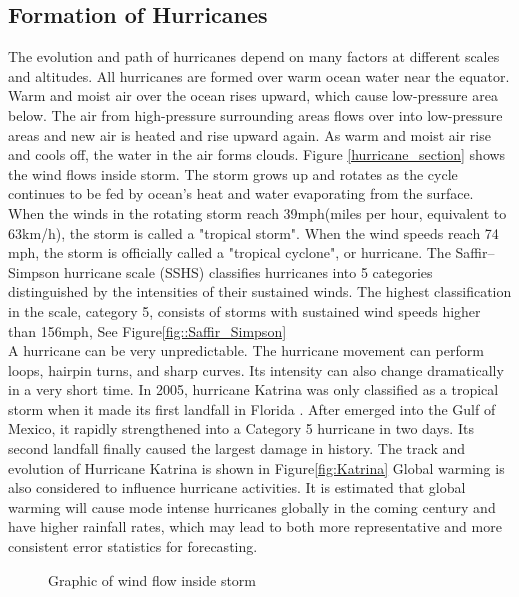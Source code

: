 \subsection{Formation of Hurricanes}
The evolution and path of hurricanes depend on many factors at different scales and altitudes. All hurricanes are formed over warm ocean water near the equator. Warm and moist air over the ocean rises upward, which cause low-pressure area below. The air from high-pressure surrounding areas flows over into low-pressure areas and new air is heated and rise upward again. As warm and moist air rise and cools off, the water in the air forms clouds. Figure \ref{hurricane_section} shows the wind flows inside storm. The storm grows up and rotates as the cycle continues to be fed by ocean's heat and water evaporating from the surface. When the winds in the rotating storm reach 39mph(miles per hour, equivalent to 63km/h), the storm is called a "tropical storm". When the wind speeds reach 74 mph, the storm is officially called a "tropical cyclone", or hurricane. The Saffir–Simpson hurricane scale (SSHS) classifies hurricanes into 5 categories distinguished by the intensities of their sustained winds. The highest classification in the scale, category 5, consists of storms with sustained wind speeds higher than 156mph, See Figure\ref{fig::Saffir_Simpson}\\
A hurricane can be very unpredictable. The hurricane movement can perform loops, hairpin turns, and sharp curves. Its intensity can also change dramatically in a very short time. In 2005, hurricane Katrina was only classified as a tropical storm when it made its first landfall in Florida . After emerged into the Gulf of Mexico, it rapidly strengthened into a Category 5 hurricane in two days. Its second landfall finally caused the largest damage in history. The track and evolution of Hurricane Katrina is shown in Figure\ref{fig:Katrina}  Global warming is also considered to influence hurricane activities. It is estimated that global warming will cause mode intense hurricanes globally in the coming century and have higher rainfall rates\cite{knutson2013dynamical}, which may lead to both more representative and more consistent error statistics for forecasting.

\begin{figure}[t]
	\begin{center}
		\hsize {}
	\end{center}
	\caption{Graphic of wind flow inside storm \cite{hurricane_energy}}
	\label{fig:hurricane_section}
\end{figure}



